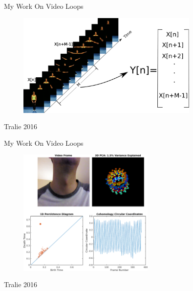 \documentclass{beamer}
\begin{document}
\begin{frame}{My Work On Video Loops}

\begin{figure}[t]
	\centering
    \includegraphics[width=0.8\textwidth]{VideoStackTime.pdf}
\end{figure}

\small Tralie 2016

\end{frame}

\begin{frame}{My Work On Video Loops}

\begin{figure}[t]
	\centering
    \includegraphics[width=0.6\textwidth]{NeckBeatPCADGMCC.pdf}
\end{figure}

\small Tralie 2016

\end{frame}


\end{document}
